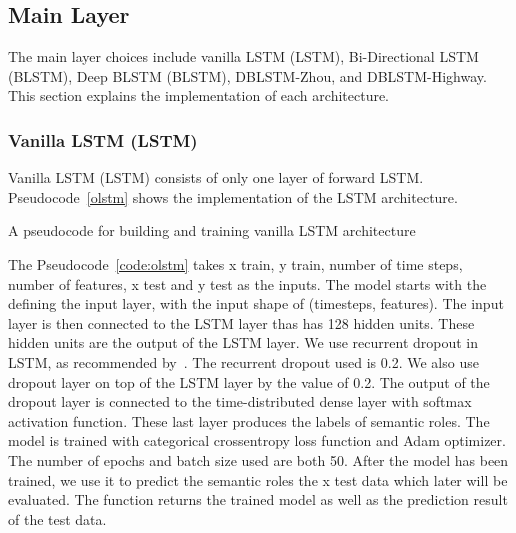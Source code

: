 \subsection{Main Layer}
The main layer choices include vanilla LSTM (LSTM), Bi-Directional LSTM (BLSTM), Deep BLSTM (BLSTM), DBLSTM-Zhou, and DBLSTM-Highway. This section explains the implementation of each architecture.

\subsubsection{Vanilla LSTM (LSTM)}
Vanilla LSTM (LSTM) consists of only one layer of forward LSTM. Pseudocode~\ref{olstm} shows the implementation of the LSTM architecture.

\begin{kode}

	
	\caption{A pseudocode for building and training vanilla LSTM architecture}
	\label{code:olstm}
\end{kode}

The Pseudocode~\ref{code:olstm} takes x train, y train, number of time steps, number of features, x test and y test as the inputs. The model starts with the defining the input layer, with the input shape of (timesteps, features). The input layer is then connected to the LSTM layer thas has 128 hidden units. These hidden units are the output of the LSTM layer. We use recurrent dropout in LSTM, as recommended by~\cite{he2017deep}. The recurrent dropout used is 0.2. We also use dropout layer on top of the LSTM layer by the value of 0.2. The output of the dropout layer is connected to the time-distributed dense layer with softmax activation function. These last layer produces the labels of semantic roles. The model is trained with categorical crossentropy loss function and Adam optimizer. The number of epochs and batch size used are both 50. After the model has been trained, we use it to predict the semantic roles the x test data which later will be evaluated. The function returns the trained model as well as the prediction result of the test data.

